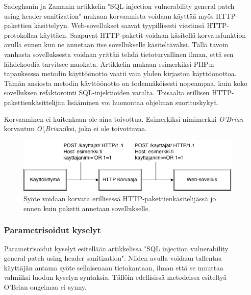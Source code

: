 \documentclass[finnish]{tktltiki2}
\theoremstyle{definition}
\theoremstyle{remark}
\begin{document}
		Sadeghanin ja Zamanin artikkelin "SQL injection vulnerability general patch using header sanitization"\space\cite{prepared} mukaan korvaamista voidaan käyttää myös HTTP-pakettien käsittelyyn. Web-sovellukset saavat tyypillisesti viestinsä HTTP-protokollaa käyttäen. Saapuvat HTTP-paketit voidaan käsitellä korvausfunktion avulla ennen kun ne annetaan itse sovellukselle käsiteltäväksi. Tällä tavoin vanhasta sovelluksesta voidaan yrittää tehdä tietoturvallinen ilman, että sen lähdekoodia tarvitsee muokata. Artikkelin mukaan esimerkiksi PHP:n tapauksessa metodin käyttöönotto vaatii vain yhden kirjaston käyttöönottoa. Tämän ansiosta metodin käyttöönotto on todennäköisesti nopeampaa, kuin koko sovelluksen refaktorointi SQL-injektioiden varalta. Toisaalta erillisen HTTP-pakettienkäsittelijän lisääminen voi huonontaa ohjelman suorituskykyä.
		
		Korvaaminen ei kuitenkaan ole aina toivottua. Esimerkiksi nimimerkki \textit{O'Brian} korvautuu \textit{O\textbackslash Brian}:iksi, joka ei ole toivottavaa. 
	
				\begin{figure}[h!]
					\caption{Syöte voidaan korvata erillisessä HTTP-pakettienkäsitelijässä jo ennen kuin paketti annetaan sovellukselle. \cite{prepared}}
					
					
					\includegraphics[scale=0.6]{http}
				\end{figure}
		
		\subsubsection{Parametrisoidut kyselyt}
		Parametrisoidut kyselyt esitellään artikkelissa "SQL injection vulnerability general patch using header sanitization"\space \cite{prepared}. Niiden avulla voidaan tallentaa käyttäjän antama syöte sellaisenaan tietokantaan, ilman että se muuttaa valmiiksi luodun kyselyn syntaksia. Tällöin edellisissä metodeissa esiteltyä O'Brian ongelmaa ei synny.
		
\end{document}
